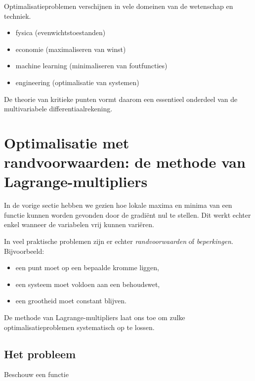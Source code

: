 \documentclass[11pt,a4paper]{article}
\begin{document}
    Optimalisatieproblemen verschijnen in vele domeinen van
    de wetenschap en techniek.

    \begin{itemize}

        \item fysica (evenwichtstoestanden)

        \item economie (maximaliseren van winst)

        \item machine learning (minimaliseren van foutfuncties)

        \item engineering (optimalisatie van systemen)

    \end{itemize}

    De theorie van kritieke punten vormt daarom een essentieel
    onderdeel van de multivariabele differentiaalrekening.


    \section{Optimalisatie met randvoorwaarden: de methode van Lagrange-multipliers}

    In de vorige sectie hebben we gezien hoe lokale maxima en minima van een functie
    kunnen worden gevonden door de gradiënt nul te stellen. Dit werkt echter enkel
    wanneer de variabelen vrij kunnen variëren.

    In veel praktische problemen zijn er echter \textit{randvoorwaarden} of
    \textit{beperkingen}. Bijvoorbeeld:

    \begin{itemize}
        \item een punt moet op een bepaalde kromme liggen,
        \item een systeem moet voldoen aan een behoudswet,
        \item een grootheid moet constant blijven.
    \end{itemize}

    De methode van Lagrange-multipliers laat ons toe om zulke
    optimalisatieproblemen systematisch op te lossen.

    \subsection{Het probleem}

    Beschouw een functie
\end{document}
